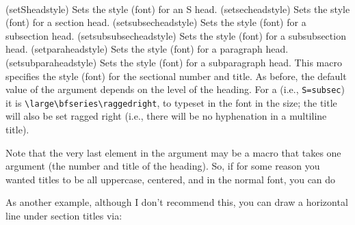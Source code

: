 \begin{syntax}
\cmd{\setSheadstyle} \\
\end{syntax}
\glossary(setSheadstyle)%
  {}%
  {Sets the style (font) for an S head.}
\glossary(setsecheadstyle)%
  {}%
  {Sets the style (font) for a section head.}
\glossary(setsubsecheadstyle)%
  {}%
  {Sets the style (font) for a subsection head.}
\glossary(setsubsubsecheadstyle)%
  {}%
  {Sets the style (font) for a subsubsection head.}
\glossary(setparaheadstyle)%
  {}%
  {Sets the style (font) for a paragraph head.}
\glossary(setsubparaheadstyle)%
  {}%
  {Sets the style (font) for a subparagraph head.}
This macro specifies the style (font) for the sectional number and title. 
As before, the default value of the  argument depends on the
level of the heading. For a \cmd{\subsection} (i.e., \verb?S=subsec?) it is
\verb?\large\bfseries\raggedright?, to typeset in the \cmd{\bfseries} font
in the \cmd{\large} size; the title will also be set ragged right (i.e.,
there will be no hyphenation in a multiline title).

    Note that the very last element in the  argument may be a 
macro that takes one argument (the number and title of the heading). So,
if for some reason you wanted \cmd{\subsubsection} titles to be all uppercase,
centered, and in the normal font, you can do
\begin{lcode}
\setsubsubsecheadstyle{\normalfont\centering\MakeUppercase}
\end{lcode}

    As another example, although I don't recommend this, you can draw a
horizontal line under section titles via:
\begin{lcode}
\newcommand{\ruledsec}[1]{%
  \Large\bfseries\raggedright #1 \rule{\textwidth}{0.4pt}}
\end{lcode}


